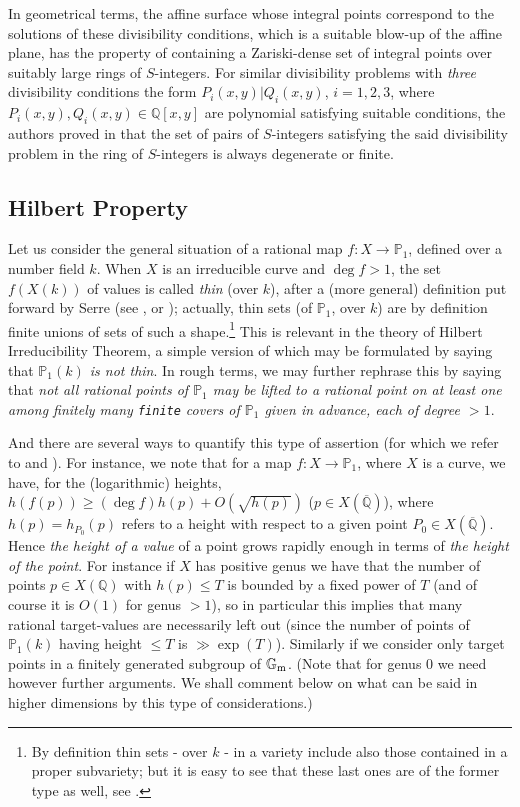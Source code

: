 \documentclass[leqno,12pt]{article} %
\def\Q{{{\mathbb Q}}}
\def\P{{{\mathbb P}}}
\def\G{{{\mathbb G}}}
\theoremstyle{plain} %
\theoremstyle{definition} %
\begin{document}
In geometrical terms, the affine surface whose integral points correspond to the solutions of these divisibility conditions, which is a suitable blow-up of the affine plane, has the property of containing a Zariski-dense set of integral points over suitably large   rings of $S$-integers. For similar divisibility problems with {\it three} divisibility conditions  the form $P_i(x,y)|Q_i(x,y)$, $i=1,2,3$, where $P_i(x,y),Q_i(x,y)\in \Q[x,y]$ are polynomial satisfying suitable conditions, the authors proved in \cite{CZadv} that the set of pairs of $S$-integers satisfying the said divisibility problem in the ring of $S$-integers is always degenerate or finite.


\subsection{Hilbert Property}\label{SS.Hilbert} 

Let us consider the general situation of a rational map $f: X\to \P_1$, defined over a number field $k$.   When $X$ is an irreducible curve and $\deg f>1$, the set  $f(X(k))$ of   values is called {\it thin} (over $k$), after a (more general) definition put forward  by {\sc Serre} (see \cite{S}, \cite{S3} or \cite{CZ-libro}); actually, thin sets (of $\P_1$, over $k$) are by definition finite unions of sets of such a shape.\footnote{By definition thin sets - over $k$ -  in a variety  include also those contained in a proper subvariety; but it is easy to see that these last ones are of the former type as well, see \cite{CZ-libro}.}  
This is relevant in the theory of  Hilbert Irreducibility Theorem, a simple version of which  may be  formulated by saying that  {\it $\P_1(k)$ is not thin}.  In rough terms, we may further rephrase this by saying that {\it  not all rational points of $\P_1$ may be lifted to a rational point  on at least one among finitely many {\tt  finite} covers of $\P_1$ given in advance, each of degree $>1$}.   

And there are several ways to quantify this type of assertion  (for which we refer to \cite{S} and \cite{BG}). For instance, we note that for a map $f:X\to \P_1$, where $X$ is a curve, we have, for the (logarithmic)  heights, $h(f(p))\ge (\deg f) h(p)+O(\sqrt{h(p)})$ ($p\in X(\overline\Q)$), where $h(p)=h_{P_0}(p)$ refers to a height with respect to a given point $P_0\in X(\overline\Q)$. Hence {\it  the height  of  a value} of a point  grows rapidly enough in terms of {\it the height of the point}. %
For instance if $X$ has positive genus we have that the number of points $p\in X(\Q)$ with $h(p)\le T$ is bounded by a fixed power of $T$ (and of course it is $O(1)$ for genus $>1$), so  in particular this implies that  many rational target-values are necessarily left out (since the number of points of $\P_1(k)$ having height $\leq T$ is $\gg \exp(T)$).  Similarly if we consider only target  points  in a finitely generated subgroup of $\G_{\rm m}$. (Note that for genus $0$ we need however further arguments. We shall comment below on what can be said in higher dimensions by this type of considerations.) 
\end{document}
